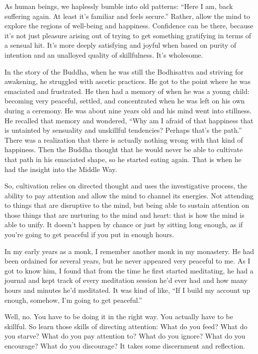 As human beings, we haplessly bumble into old patterns: “Here I am, back
suffering again. At least it’s familiar and feels secure.” Rather, allow
the mind to explore the regions of well-being and happiness. Confidence
can be there, because it’s not just pleasure arising out of trying to
get something gratifying in terms of a sensual hit. It’s more deeply
satisfying and joyful when based on purity of intention and an unalloyed
quality of skillfulness. It’s wholesome.

In the story of the Buddha, when he was still the Bodhisattva and
striving for awakening, he struggled with ascetic practices. He got to
the point where he was emaciated and frustrated. He then had a memory of
when he was a young child: becoming very peaceful, settled, and
concentrated when he was left on his own during a ceremony. He was about
nine years old and his mind went into stillness. He recalled that memory
and wondered, “Why am I afraid of that happiness that is untainted by
sensuality and unskillful tendencies? Perhaps that’s the path.” There
was a realization that there is actually nothing wrong with that kind of
happiness. Then the Buddha thought that he would never be able to
cultivate that path in his emaciated shape, so he started eating again.
That is when he had the insight into the Middle Way.

So, cultivation relies on directed thought and uses the investigative
process, the ability to pay attention and allow the mind to channel its
energies. Not attending to things that are disruptive to the mind, but
being able to sustain attention on those things that are nurturing to
the mind and heart: that is how the mind is able to unify. It doesn’t
happen by chance or just by sitting long enough, as if you’re going to
get peaceful if you put in enough hours.

In my early years as a monk, I remember another monk in my monastery. He
had been ordained for several years, but he never appeared very peaceful
to me. As I got to know him, I found that from the time he first started
meditating, he had a journal and kept track of every meditation session
he’d ever had and how many hours and minutes he’d meditated. It was kind
of like, “If I build my account up enough, somehow, I’m going to get
peaceful.”

Well, no. You have to be doing it in the right way. You actually have to
be skillful. So learn those skills of directing attention: What do you
feed? What do you starve? What do you pay attention to? What do you
ignore? What do you encourage? What do you discourage? It takes some
discernment and reflection.

